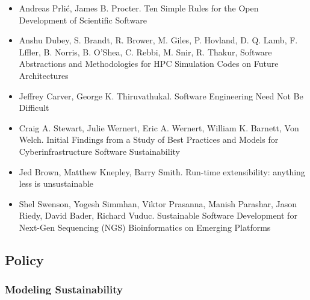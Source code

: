 \documentclass[11pt, oneside]{amsart}
\begin{document}
\begin{itemize}

\item Andreas Prli\'{c}, James B. Procter. Ten Simple Rules for the Open Development of Scientific Software \cite{Prlic_WSSSPE}

\item Anshu Dubey, S. Brandt, R. Brower, M. Giles, P. Hovland, D. Q. Lamb, F. Lffler, B. Norris, B. O'Shea, C. Rebbi, M. Snir, R. Thakur, Software Abstractions and Methodologies for HPC Simulation Codes on Future Architectures \cite{Dubey2_WSSSPE}

\item Jeffrey Carver, George K. Thiruvathukal. Software Engineering Need Not Be Difficult \cite{Carver_WSSSPE}

\item Craig A. Stewart, Julie Wernert, Eric A. Wernert, William K. Barnett, Von Welch. Initial Findings from a Study of Best Practices and Models for Cyberinfrastructure Software Sustainability \cite{Stewart_WSSSPE}

\item Jed Brown, Matthew Knepley, Barry Smith. Run-time extensibility: anything less is unsustainable \cite{Brown_WSSSPE}

\item Shel Swenson, Yogesh Simmhan, Viktor Prasanna, Manish Parashar, Jason Riedy, David Bader, Richard Vuduc. Sustainable Software Development for Next-Gen Sequencing (NGS) Bioinformatics on Emerging Platforms \cite{Swenson_WSSSPE}
 
\end{itemize}

\subsection{Policy}

\subsubsection{Modeling Sustainability}
\end{document}
